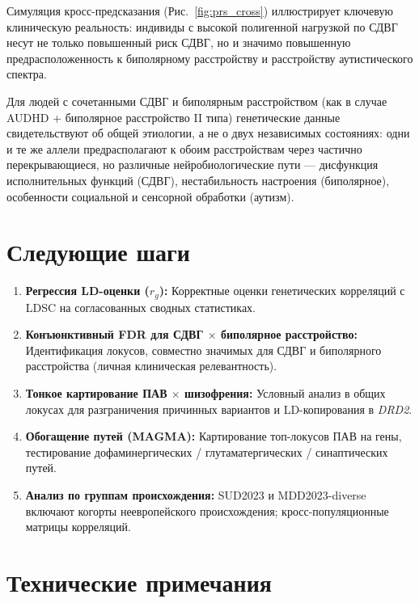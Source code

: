 \documentclass[11pt, a4paper]{article}
\begin{document}
Симуляция кросс-предсказания (Рис.~\ref{fig:prs_cross}) иллюстрирует ключевую
клиническую реальность: индивиды с высокой полигенной нагрузкой по СДВГ несут
не только повышенный риск СДВГ, но и значимо повышенную предрасположенность
к биполярному расстройству и расстройству аутистического спектра.

Для людей с сочетанными СДВГ и биполярным расстройством (как в случае
AUDHD + биполярное расстройство II типа) генетические данные свидетельствуют
об общей этиологии, а не о двух независимых состояниях: одни и те же аллели
предрасполагают к обоим расстройствам через частично перекрывающиеся, но
различные нейробиологические пути — дисфункция исполнительных функций (СДВГ),
нестабильность настроения (биполярное), особенности социальной и сенсорной
обработки (аутизм).

\section{Следующие шаги}

\begin{enumerate}[leftmargin=1.8em]
  \item \textbf{Регрессия LD-оценки ($r_g$):} Корректные оценки генетических
        корреляций с LDSC на согласованных сводных статистиках.
  \item \textbf{Конъюнктивный FDR для СДВГ $\times$ биполярное расстройство:}
        Идентификация локусов, совместно значимых для СДВГ и биполярного
        расстройства (личная клиническая релевантность).
  \item \textbf{Тонкое картирование ПАВ $\times$ шизофрения:} Условный анализ
        в общих локусах для разграничения причинных вариантов и LD-копирования
        в \textit{DRD2}.
  \item \textbf{Обогащение путей (MAGMA):} Картирование топ-локусов ПАВ на
        гены, тестирование дофаминергических / глутаматергических /
        синаптических путей.
  \item \textbf{Анализ по группам происхождения:} SUD2023 и MDD2023-diverse
        включают когорты неевропейского происхождения; кросс-популяционные
        матрицы корреляций.
\end{enumerate}

\section*{Технические примечания}
\end{document}
